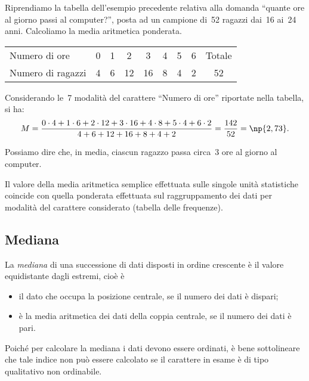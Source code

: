 \begin{exrig}
 \begin{esempio}

Riprendiamo la tabella dell'esempio precedente relativa alla domanda ``quante ore al giorno passi al computer?'',
posta ad un campione di~52 ragazzi dai~16 ai~24 anni. Calcoliamo la media aritmetica ponderata.
\begin{center}
 \begin{tabular}{lcccccccc}
 \toprule
 Numero di ore & 0 & 1 & 2 & 3 & 4 & 5 & 6 & Totale\\
 Numero di ragazzi & 4 & 6 & 12 & 16 & 8 & 4 & 2 & 52\\
 \bottomrule
\end{tabular}
\end{center}

Considerando le~7 modalità del carattere ``Numero di ore'' riportate nella tabella, si ha:
\begin{equation*}
M=\frac{0\cdot 4+1\cdot 6+2\cdot 12+3\cdot 16+4\cdot 8+5\cdot 4+6\cdot 2}{4+6+12+16+8+4+2}=\frac{142}{52}=\np{2,73}.
\end{equation*}

Possiamo dire che, in media, ciascun ragazzo passa circa~3 ore al giorno al computer.
\end{esempio}
\end{exrig}

Il valore della media aritmetica semplice effettuata sulle singole unità statistiche coincide con quella ponderata effettuata sul raggruppamento dei dati per modalità del carattere considerato (tabella delle frequenze).

\subsection{Mediana}
\begin{definizione}
La \emph{mediana} di una successione di dati disposti in ordine crescente è il valore equidistante dagli estremi, cioè è
\begin{itemize}
\item il dato che occupa la posizione centrale, se il numero dei dati è dispari;
\item è la media aritmetica dei dati della coppia centrale, se il numero dei dati è pari.
\end{itemize}
\end{definizione}

Poiché per calcolare la mediana i dati devono essere ordinati, è bene sottolineare che tale indice non può essere calcolato se il carattere in esame è di tipo qualitativo non ordinabile.

